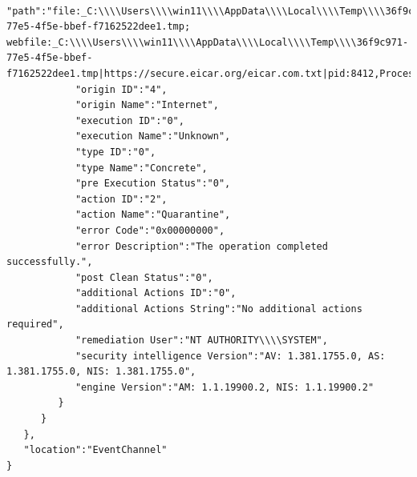 \begin{itemize}
\begin{verbatim}
            "path":"file:_C:\\\\Users\\\\win11\\\\AppData\\\\Local\\\\Temp\\\\36f9c971-77e5-4f5e-bbef-f7162522dee1.tmp; webfile:_C:\\\\Users\\\\win11\\\\AppData\\\\Local\\\\Temp\\\\36f9c971-77e5-4f5e-bbef-f7162522dee1.tmp|https://secure.eicar.org/eicar.com.txt|pid:8412,ProcessStart:133173854939240064",
            "origin ID":"4",
            "origin Name":"Internet",
            "execution ID":"0",
            "execution Name":"Unknown",
            "type ID":"0",
            "type Name":"Concrete",
            "pre Execution Status":"0",
            "action ID":"2",
            "action Name":"Quarantine",
            "error Code":"0x00000000",
            "error Description":"The operation completed successfully.",
            "post Clean Status":"0",
            "additional Actions ID":"0",
            "additional Actions String":"No additional actions required",
            "remediation User":"NT AUTHORITY\\\\SYSTEM",
            "security intelligence Version":"AV: 1.381.1755.0, AS: 1.381.1755.0, NIS: 1.381.1755.0",
            "engine Version":"AM: 1.1.19900.2, NIS: 1.1.19900.2"
         }
      }
   },
   "location":"EventChannel"
}
    \end{verbatim}


\end{itemize}
